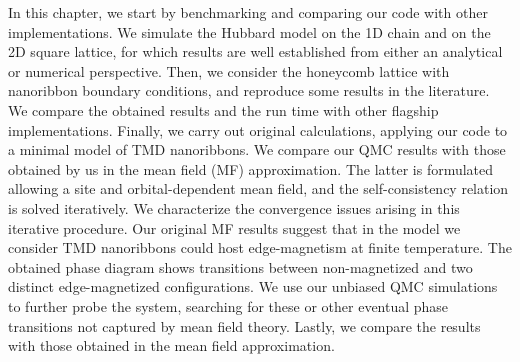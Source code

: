 
\label{cap:applications}

\slshape

In this chapter, we start by benchmarking and comparing our code with other implementations.
We simulate the Hubbard model on the \acs{1D} chain and on the \acs{2D} square lattice, for which results are well established from either an analytical or numerical perspective.
Then, we consider the honeycomb lattice with  nanoribbon boundary conditions, and reproduce some results in the literature.
We compare the obtained results and the run time with other flagship implementations.
Finally, we carry out original calculations, applying our code to a minimal model of \acs{TMD} nanoribbons.
We compare our \acs{QMC} results with those obtained by us in the mean field (MF)  approximation.
The latter is formulated allowing a site and orbital-dependent mean field, and the self-consistency relation is solved iteratively.
We characterize the convergence issues arising in this iterative procedure.
Our original MF results suggest that in the model we consider \acs{TMD} nanoribbons could host edge-magnetism at finite temperature.
The obtained phase diagram shows transitions between non-magnetized and two distinct edge-magnetized configurations.
We use our unbiased \acs{QMC} simulations to further probe the system, searching for these or other eventual phase transitions not captured by mean field theory.
Lastly, we compare the results with those obtained in the mean field approximation.

\normalfont




